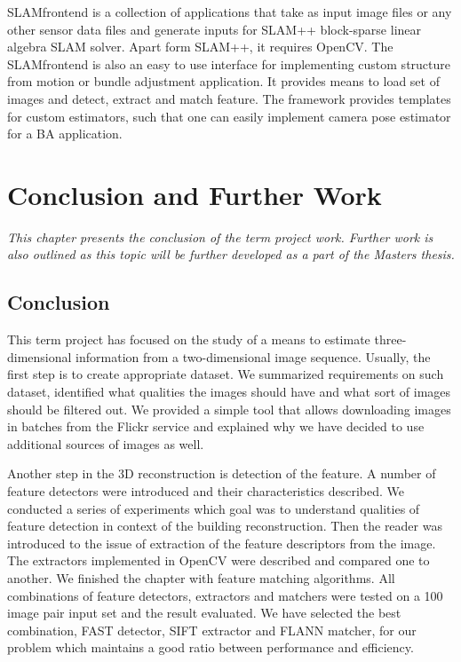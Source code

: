 SLAM\textunderscore frontend \cite{www:slam_frontend} is a collection of applications that take as input image files or any other sensor data files and generate inputs for SLAM++ block-sparse linear algebra SLAM solver. Apart form SLAM++, it requires OpenCV. The SLAM\textunderscore frontend is also an easy to use interface for implementing custom structure from motion or bundle adjustment application. It provides means to load set of images and detect, extract and match feature. The framework provides templates for custom estimators, such that one can easily implement camera pose estimator for a BA application.

\chapter{Conclusion and Further Work}
\label{chapter:conclusion}
\textit{This chapter presents the conclusion of the term project work. Further work is also outlined as this topic will be further developed as a part of the Masters thesis.}

\section{Conclusion}
This term project has focused on the study of a means to estimate three-dimensional information from a two-dimensional image sequence. Usually, the first step is to create appropriate dataset. We summarized requirements on such dataset, identified what qualities the images should have and what sort of images should be filtered out. We provided a simple tool that allows downloading images in batches from the Flickr service and explained why we have decided to use additional sources of images as well. 

Another step in the 3D reconstruction is detection of the feature. A number of feature detectors were introduced and their characteristics described. We conducted a series of experiments which goal was to understand qualities of feature detection in context of the building reconstruction. Then the reader was introduced to the issue of extraction of the feature descriptors from the image. The extractors implemented in OpenCV were described and compared one to another. We finished the chapter with feature matching algorithms. All combinations of feature detectors, extractors and matchers were tested on a 100 image pair input set and the result evaluated. We have selected the best combination, FAST detector, SIFT extractor and FLANN matcher, for our problem which maintains a good ratio between performance and efficiency.

